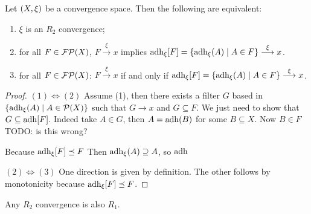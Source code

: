 \begin{proposition}
Let $\left( X,\xi \right)$ be a convergence space. Then the following are equivalent:
\begin{enumerate}
\item $\xi$ is an $R_2$ convergence;
\item for all $F\in\operatorname{\mathcal{FP}}(X)$, $F\overset{\xi}{\longrightarrow} x$ implies $\adh_\xi[F] = \setbuilder{\adh_\xi(A)}{A\in F} \overset{\xi}{\longrightarrow} x$.
\item for all $F\in\operatorname{\mathcal{FP}}(X)$: $F\overset{\xi}{\longrightarrow} x$ \textup{if and only if} $\adh_\xi[F] = \setbuilder{\adh_\xi(A)}{A\in F} \overset{\xi}{\longrightarrow} x$.
\end{enumerate}
\end{proposition}
\begin{proof}
$(1) \Leftrightarrow (2)$ Assume (1), then there exists a filter $G$ based in $\setbuilder{\adh_\xi(A)}{A\in\powerset(X)}$ such that $G\to x$ and $G\subseteq F$. We just need to show that $G\subseteq \operatorname{adh}[F]$. Indeed take $A\in G$, then $A = \operatorname{adh}(B)$ for some $B\subseteq X$. Now $B\in F$ TODO: is this wrong?

Because $\operatorname{adh}_\xi[F]\preceq F$ Then $\operatorname{adh}_\xi(A) \supseteq A$, so $\operatorname{adh}$ 

$(2) \Leftrightarrow (3)$ One direction is given by definition. The other follows by monotonicity because $\operatorname{adh}_\xi[F] \preceq F$.
\end{proof}

\begin{lemma}
Any $R_2$ convergence is also $R_1$.
\end{lemma}

